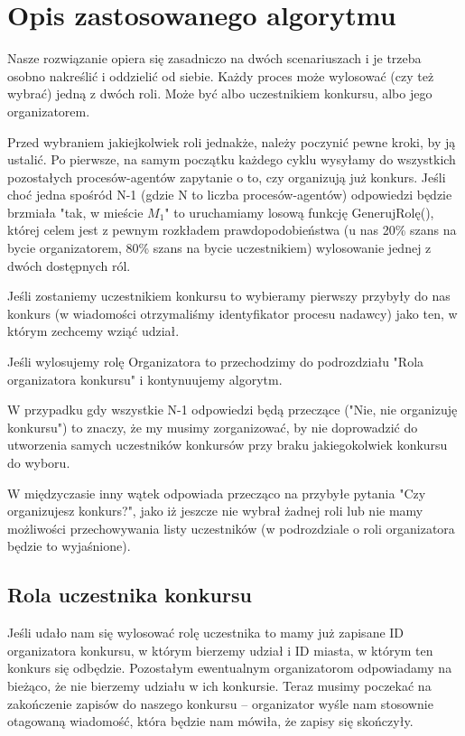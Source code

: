 \documentclass{article}
\begin{document}
\section{Opis zastosowanego algorytmu}

Nasze rozwiązanie opiera się zasadniczo na dwóch scenariuszach i je trzeba osobno nakreślić i oddzielić od siebie. Każdy proces może wylosować (czy też wybrać) jedną z dwóch roli. Może być albo uczestnikiem konkursu, albo jego organizatorem.

Przed wybraniem jakiejkolwiek roli jednakże, należy poczynić pewne kroki, by ją ustalić. Po pierwsze, na samym początku każdego cyklu wysyłamy do wszystkich pozostałych procesów-agentów zapytanie o to, czy organizują już konkurs. Jeśli choć jedna spośród N-1 (gdzie N to liczba procesów-agentów) odpowiedzi będzie brzmiała "tak, w mieście $M_{1}$" to uruchamiamy losową funkcję GenerujRolę(), której celem jest z pewnym rozkładem prawdopodobieństwa (u nas 20\% szans na bycie organizatorem, 80\% szans na bycie uczestnikiem) wylosowanie jednej z dwóch dostępnych ról. 

Jeśli zostaniemy uczestnikiem konkursu to wybieramy pierwszy przybyły do nas konkurs (w wiadomości otrzymaliśmy identyfikator procesu nadawcy) jako ten, w którym zechcemy wziąć udział. 

Jeśli wylosujemy rolę Organizatora to przechodzimy do podrozdziału "Rola organizatora konkursu" i kontynuujemy algorytm.

W przypadku gdy wszystkie N-1 odpowiedzi będą przeczące ("Nie, nie organizuję konkursu") to znaczy, że my musimy zorganizować, by nie doprowadzić do utworzenia samych uczestników konkursów przy braku jakiegokolwiek konkursu do wyboru.

W międzyczasie inny wątek odpowiada przecząco na przybyłe pytania "Czy organizujesz konkurs?", jako iż jeszcze nie wybrał żadnej roli lub nie mamy możliwości przechowywania listy uczestników (w podrozdziale o roli organizatora będzie to wyjaśnione).

\subsection{Rola uczestnika konkursu}

Jeśli udało nam się wylosować rolę uczestnika to mamy już zapisane ID organizatora konkursu, w którym bierzemy udział i ID miasta, w którym ten konkurs się odbędzie. Pozostałym ewentualnym organizatorom odpowiadamy na bieżąco, że nie bierzemy udziału w ich konkursie. Teraz musimy poczekać na zakończenie zapisów do naszego konkursu -- organizator wyśle nam stosownie otagowaną wiadomość, która będzie nam mówiła, że zapisy się skończyły. 
\end{document}
